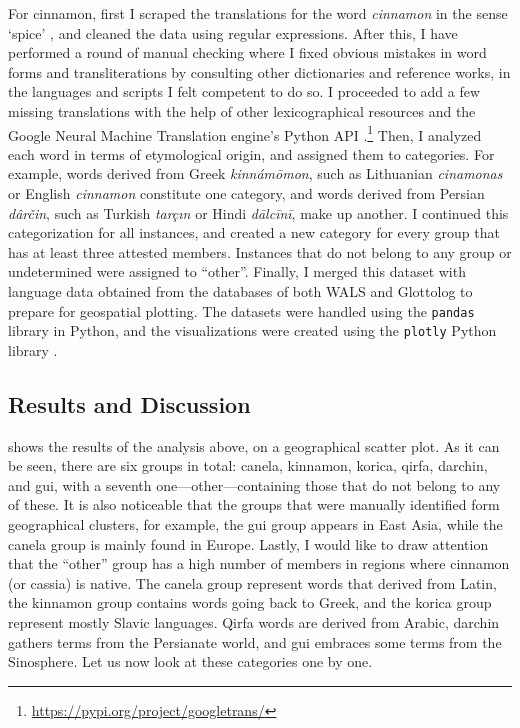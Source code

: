 For cinnamon, first I scraped the translations for the word \textit{cinnamon} in the sense `spice' \autocite{wiktionary_cinnamon_nodate}, and cleaned the data using regular expressions. After this, I have performed a round of manual checking where I fixed obvious mistakes in word forms and transliterations by consulting other dictionaries and reference works, in the languages and scripts I felt competent to do so. I proceeded to add a few missing translations with the help of other lexicographical resources and the Google Neural Machine Translation engine's Python API \autocite{wu_googles_2016}.\footnote{\url{https://pypi.org/project/googletrans/}} Then, I analyzed each word in terms of etymological origin, and assigned them to categories. For example, words derived from Greek \textit{kinnámōmon}, such as Lithuanian \textit{cinamonas} or English \textit{cinnamon} constitute one category, and words derived from Persian \textit{dârčin}, such as Turkish \textit{tarçın} or Hindi \textit{dālcīnī}, make up another. I continued this categorization for all instances, and created a new category for every group that has at least three attested members. Instances that do not belong to any group or undetermined were assigned to ``other''. Finally, I merged this dataset with language data obtained from the databases of both \gls{WALS} \autocite{dryer_wals_2013} and Glottolog \autocite{hammarstrom_glottolog_2022} to prepare for geospatial plotting. The datasets were handled using the \texttt{pandas} library in Python, and the visualizations were created using the \texttt{plotly} Python library \autocites{pandas, plotly}.

\subsection{Results and Discussion}

 shows the results of the analysis above, on a geographical scatter plot. As it can be seen, there are six groups in total: canela, kinnamon, korica, qirfa, darchin, and gui, with a seventh one---other---containing those that do not belong to any of these. It is also noticeable that the groups that were manually identified form geographical clusters, for example, the gui group appears in East Asia, while the canela group is mainly found in Europe. Lastly, I would like to draw attention that the ``other'' group has a high number of members in regions where cinnamon (or cassia) is native. The canela group represent words that derived from Latin, the kinnamon group contains words going back to Greek, and the korica group represent mostly Slavic languages. Qirfa words are derived from Arabic, darchin gathers terms from the Persianate world, and gui embraces some terms from the Sinosphere. Let us now look at these categories one by one.

